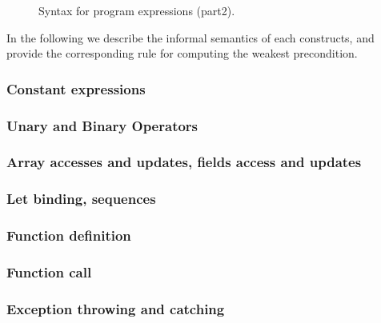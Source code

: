 \begin{figure}
  \begin{center}\framebox{}\end{center}
  \caption{Syntax for program expressions (part2).}
\label{fig:bnf:exprb}
\end{figure}

In the following we describe the informal semantics of each constructs, and provide the corresponding rule for computing the weakest precondition.


\subsubsection{Constant expressions}


\subsubsection{Unary and Binary Operators}

\todo{}

\subsubsection{Array accesses and updates, fields access and updates}

\todo{}

\subsubsection{Let binding, sequences}

\todo{}

\subsubsection{Function definition}


\subsubsection{Function call}

\todo{}

\subsubsection{Exception throwing and catching}

